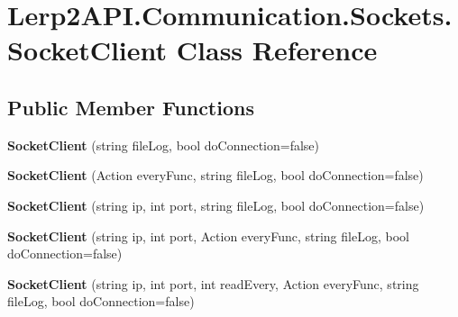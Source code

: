\hypertarget{class_lerp2_a_p_i_1_1_communication_1_1_sockets_1_1_socket_client}{}\section{Lerp2\+A\+P\+I.\+Communication.\+Sockets.\+Socket\+Client Class Reference}
\label{class_lerp2_a_p_i_1_1_communication_1_1_sockets_1_1_socket_client}
\subsection*{Public Member Functions}
\begin{DoxyCompactItemize}
\item 
\mbox{\label{class_lerp2_a_p_i_1_1_communication_1_1_sockets_1_1_socket_client_a56e84fbccfecedf55e3ba4d5eee6ffc2}} 
{\bfseries Socket\+Client} (string file\+Log, bool do\+Connection=false)
\item 
\mbox{\label{class_lerp2_a_p_i_1_1_communication_1_1_sockets_1_1_socket_client_a1526a744e0cde24ab100f00efbd792dd}} 
{\bfseries Socket\+Client} (Action every\+Func, string file\+Log, bool do\+Connection=false)
\item 
\mbox{\label{class_lerp2_a_p_i_1_1_communication_1_1_sockets_1_1_socket_client_a64e305d0cec95bc38875d874a118110b}} 
{\bfseries Socket\+Client} (string ip, int port, string file\+Log, bool do\+Connection=false)
\item 
\mbox{\label{class_lerp2_a_p_i_1_1_communication_1_1_sockets_1_1_socket_client_a70e0b9026b0186405e32f669cfd46952}} 
{\bfseries Socket\+Client} (string ip, int port, Action every\+Func, string file\+Log, bool do\+Connection=false)
\item 
\mbox{\label{class_lerp2_a_p_i_1_1_communication_1_1_sockets_1_1_socket_client_a0533e1e8f1715491d52cf2f87e7577fa}} 
{\bfseries Socket\+Client} (string ip, int port, int read\+Every, Action every\+Func, string file\+Log, bool do\+Connection=false)

\end{DoxyCompactItemize}
